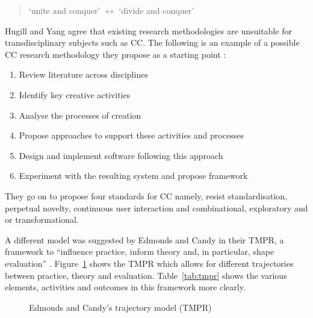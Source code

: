 \begin{quotation}
  `unite and conquer' $\longleftrightarrow$ `divide and conquer' 
\end{quotation}

Hugill and Yang agree that existing research methodologies are unsuitable for transdisciplinary subjects such as \ac{CC}. The following is an example of a possible \ac{CC} research methodology they propose as a starting point \autocite{Hugill2013c}:

\begin{enumerate}
  \item Review literature across disciplines
  \item Identify key creative activities
  \item Analyse the processes of creation
  \item Propose approaches to support these activities and processes
  \item Design and implement software following this approach
  \item Experiment with the resulting system and propose framework
\end{enumerate}

They go on to propose four standards for \ac{CC} \autocite{Hugill2013c} namely, resist standardisation, perpetual novelty, continuous user interaction and combinational, exploratory and or transformational.

A different model was suggested by Edmonds and Candy in their \ac{TMPR}, a framework to ``influence practice, inform theory and, in particular, shape evaluation'' \citeyear{Edmonds2010}. Figure~\ref{fig:tmpr} shows the \ac{TMPR} which allows for different trajectories between practice, theory and evaluation. Table~\ref{tab:tmpr} shows the various elements, activities and outcomes in this framework more clearly.

\begin{figure}[!htbp] %
  \centering
  \caption[Trajectory model]{Edmonds and Candy's trajectory model (TMPR)}
\label{fig:tmpr}
\end{figure}

